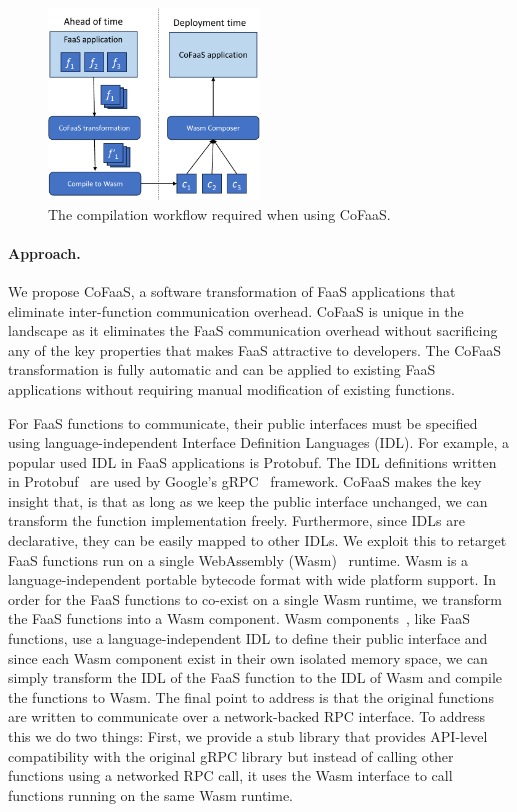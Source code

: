 \documentclass[../main.tex]{subfiles}
\begin{document}
\begin{refsection}
\begin{figure}[ht]
  \centering
  \includegraphics[width=0.5\textwidth]{papers/paper5-cofaas/figures/cofaas_compilation.pdf}
  \caption{\label{fig:cofaas-comp} The compilation workflow required when using CoFaaS.}
\end{figure}


\paragraph{Approach.}
We propose CoFaaS, a software transformation of FaaS applications that eliminate inter-function communication overhead. CoFaaS is unique in the landscape as it eliminates the FaaS communication overhead without sacrificing any of the key properties that makes FaaS attractive to developers. The CoFaaS transformation is fully automatic and can be applied to existing FaaS applications without requiring manual modification of existing functions.


For FaaS functions to communicate, their public interfaces must be
specified using language-independent Interface Definition Languages
(IDL). For example, a popular used IDL in FaaS applications is
Protobuf. The IDL definitions written in Protobuf~\cite{protobuf} are
used by Google's gRPC~\cite{grpc} framework. CoFaaS makes the key
insight that, is that as long as we keep the public interface
unchanged, we can transform the function implementation
freely. Furthermore, since IDLs are declarative, they can be easily
mapped to other IDLs. We exploit this to retarget FaaS functions run
on a single WebAssembly (Wasm)~\cite{rossberg22_webas_core_specif}
runtime. Wasm is a language-independent portable bytecode format with
wide platform support. In order for the FaaS functions to co-exist on
a single Wasm runtime, we transform the FaaS functions into a Wasm
component. Wasm components~\cite{compmodel}, like FaaS functions, use
a language-independent IDL to define their public interface and since
each Wasm component exist in their own isolated memory space, we can
simply transform the IDL of the FaaS function to the IDL of Wasm and
compile the functions to Wasm. The final point to address is that the
original functions are written to communicate over a network-backed
RPC interface. To address this we do two things: First, we provide a
stub library that provides API-level compatibility with the original
gRPC library but instead of calling other functions using a networked
RPC call, it uses the Wasm interface to call functions running on the
same Wasm runtime.


\end{refsection}
\end{document}
